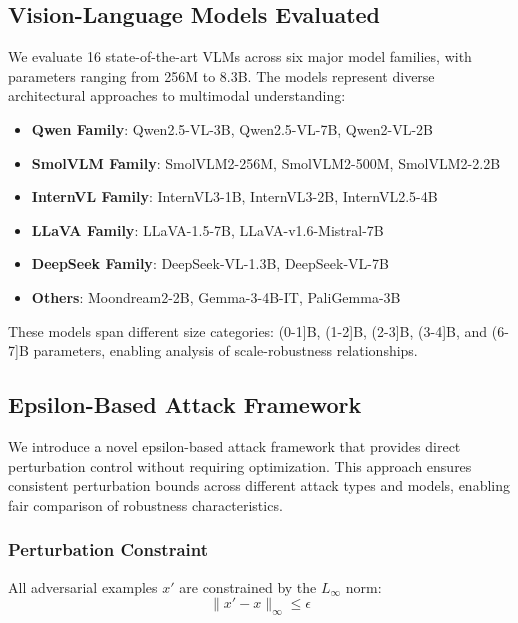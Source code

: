 \label{sec:methodology}

\subsection{Vision-Language Models Evaluated}

We evaluate 16 state-of-the-art VLMs across six major model families, with parameters ranging from 256M to 8.3B. The models represent diverse architectural approaches to multimodal understanding:

\begin{itemize}
    \item \textbf{Qwen Family}: Qwen2.5-VL-3B, Qwen2.5-VL-7B, Qwen2-VL-2B
    \item \textbf{SmolVLM Family}: SmolVLM2-256M, SmolVLM2-500M, SmolVLM2-2.2B
    \item \textbf{InternVL Family}: InternVL3-1B, InternVL3-2B, InternVL2.5-4B
    \item \textbf{LLaVA Family}: LLaVA-1.5-7B, LLaVA-v1.6-Mistral-7B
    \item \textbf{DeepSeek Family}: DeepSeek-VL-1.3B, DeepSeek-VL-7B
    \item \textbf{Others}: Moondream2-2B, Gemma-3-4B-IT, PaliGemma-3B
\end{itemize}

These models span different size categories: (0-1]B, (1-2]B, (2-3]B, (3-4]B, and (6-7]B parameters, enabling analysis of scale-robustness relationships.

\subsection{Epsilon-Based Attack Framework}

We introduce a novel epsilon-based attack framework that provides direct perturbation control without requiring optimization. This approach ensures consistent perturbation bounds across different attack types and models, enabling fair comparison of robustness characteristics.

\subsubsection{Perturbation Constraint}

All adversarial examples $x'$ are constrained by the $L_\infty$ norm:
\begin{equation}
\|x' - x\|_\infty \leq \epsilon
\end{equation}

